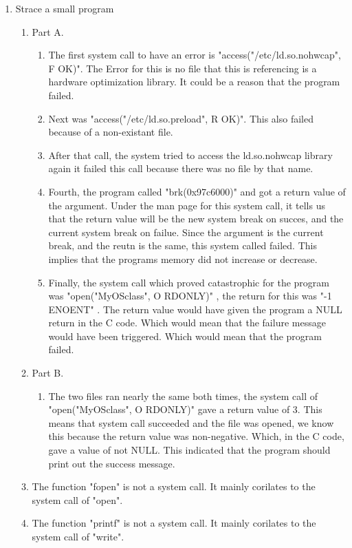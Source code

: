 \documentclass[a4paper]{article}
\begin{document}
\begin {enumerate}
	\item Strace a small program
		\begin {enumerate}
		\item Part A.
			\begin {enumerate}
			\item The first system call to have an error is "access("/etc/ld.so.nohwcap", F OK)". The Error for this is no file that this is referencing is a hardware optimization library. It could be a reason that the program failed.
			\item Next was "access("/etc/ld.so.preload", R OK)". This also failed because of a non-existant file. 
			\item After that call, the system tried to access the ld.so.nohwcap library again it failed this call because there was no file by that name.
			\item Fourth, the program called "brk(0x97c6000)" and got a return value of the argument. Under the man page for this system call, it tells us that the return value will be the new system break on succes, and the current system break on failue. Since the argument is the current break, and the reutn is the same, this system called failed. This implies that the programs memory did not increase or decrease.
			\item Finally, the system call which proved catastrophic for the program was "open("MyOSclass", O RDONLY)" , the return for this was "-1 ENOENT" . The return value would have given the program a NULL return in the C code. Which would mean that the failure message would have been triggered. Which would mean that the program failed.
			\end {enumerate}
		\item Part B.
			\begin {enumerate}
			\item The two files ran nearly the same both times, the system call of "open("MyOSclass", O RDONLY)" gave a return value of 3. This means that system call succeeded and the file was opened, we know this because the return value was non-negative. Which, in the C code, gave a value of not NULL. This indicated that the program should print out the success message.
			\end {enumerate}
		\item The function "fopen" is not a system call. It mainly corilates to the system call of "open".
		\item The function "printf" is not a system call. It mainly corilates to the system call of "write".

\end{enumerate}
\end{enumerate}
\end{document}
